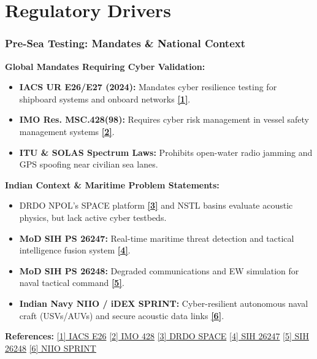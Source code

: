 \documentclass{beamer}
\begin{document}
\section{Regulatory Drivers}
\begin{frame}
\frametitle{\textbf{Pre-Sea Testing: Mandates \& National Context}}

\footnotesize
\textbf{Global Mandates Requiring Cyber Validation:}
\begin{itemize}
    \setlength\itemsep{0.1em}
    \item \textbf{IACS UR E26/E27 (2024):} Mandates cyber resilience testing for shipboard systems and onboard networks \href{https://iacs.org.uk}{\textbf{[1]}}.
    \item \textbf{IMO Res. MSC.428(98):} Requires cyber risk management in vessel safety management systems \href{https://www.imo.org}{\textbf{[2]}}.
    \item \textbf{ITU \& SOLAS Spectrum Laws:} Prohibits open-water radio jamming and GPS spoofing near civilian sea lanes.
\end{itemize}

\vspace{0.1cm}
\textbf{Indian Context \& Maritime Problem Statements:}
\begin{itemize}
    \setlength\itemsep{0.1em}
    \item DRDO NPOL's SPACE platform \href{https://www.pib.gov.in/PressReleasePage.aspx?PRID=2018151}{\textbf{[3]}} and NSTL basins evaluate acoustic physics, but lack active cyber testbeds.
    \item \textbf{MoD SIH PS 26247:} Real-time maritime threat detection and tactical intelligence fusion system \href{https://www.sih.gov.in/sih2026PS}{\textbf{[4]}}.
    \item \textbf{MoD SIH PS 26248:} Degraded communications and EW simulation for naval tactical command \href{https://www.sih.gov.in/sih2026PS}{\textbf{[5]}}.
    \item \textbf{Indian Navy NIIO / iDEX SPRINT:} Cyber-resilient autonomous naval craft (USVs/AUVs) and secure acoustic data links \href{https://idex.gov.in}{\textbf{[6]}}.
\end{itemize}

\vspace{0.1cm}
\tiny
\textbf{References:} 
\href{https://iacs.org.uk}{[1] IACS E26} \quad 
\href{https://www.imo.org}{[2] IMO 428} \quad 
\href{https://www.pib.gov.in/PressReleasePage.aspx?PRID=2018151}{[3] DRDO SPACE} \quad
\href{https://www.sih.gov.in/sih2026PS}{[4] SIH 26247} \quad
\href{https://www.sih.gov.in/sih2026PS}{[5] SIH 26248} \quad
\href{https://idex.gov.in}{[6] NIIO SPRINT}
\end{frame}
\end{document}
